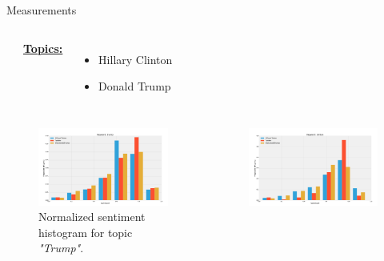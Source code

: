 \documentclass{beamer}
\begin{document}
\begin{frame}[fragile]
\begin{columns}[T]
\begin{column}{.63\textwidth}
\begin{block}{Measurements}
\begin{columns}
\begin{itemize}
            \end{itemize}
            \underline{\textbf{Topics:}}
            \vspace{1cm}
            \begin{itemize}
                \item Hillary Clinton
                \item Donald Trump
            \end{itemize}
    \end{columns}
    \begin{columns}
            \begin{figure}
                \centering
                \captionsetup{justification=centering,margin=2cm}
                \includegraphics[scale=0.585]{./Pics/hist-trump.png}
                \caption*{Normalized sentiment histogram for topic \textit{"Trump"}.}
            \end{figure}
            \begin{figure}
                \centering
                \captionsetup{justification=centering,margin=2cm}
                \includegraphics[scale=0.585]{./Pics/hist-clinton.png}

\end{figure}
\end{columns}
\end{block}
\end{column}
\end{columns}
\end{frame}
\end{document}
